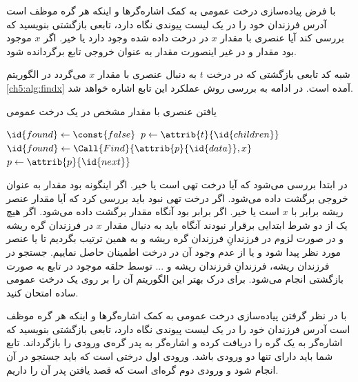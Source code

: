 
 با فرض پیاده‌سازی درخت عمومی به کمک اشاره‌گرها و اینکه هر گره موظف است آدرس فرزندان خود را در یک لیست پیوندی نگاه دارد، تابعی بازگشتی بنویسید که بررسی کند آیا عنصری با مقدار {$x$} در درخت داده شده وجود دارد یا خیر. اگر {$x$} موجود بود مقدار {} و در غیر اینصورت مقدار {} به عنوان خروجی تابع برگردانده شود.


شبه کد تابعی بازگشتی که در درخت {$t$} به دنبال عنصری با مقدار {$x$} می‌گردد در الگوریتم {\eqref{ch5:alg:findx}} آمده است. در ادامه به بررسی روش عملکرد این تابع اشاره خواهد شد.
\begin{algorithm}
\caption{یافتن عنصری با مقدار مشخص در یک درخت عمومی}\label{ch5:alg:findx}
\begin{latin}
\begin{algorithmic}[1]
				\State	\Return
		\EndIf
				\State	\Return {}
		\EndIf
		\State	$\id{found} \gets \const{false}$
		\State	$p \gets \attrib{t}{\id{children}}$
				\State	$\id{found} \gets \Call{Find}{\attrib{p}{\id{data}},x}$
				\State	$p \gets \attrib{p}{\id{next}}$
		\EndWhile
		\State	\Return {}
\EndFunction
\end{algorithmic}
\end{latin}
\end{algorithm}

در ابتدا بررسی می‌شود که آیا درخت تهی است یا خیر. اگر اینگونه بود مقدار {} به عنوان خروجی برگشت داده می‌شود. اگر درخت تهی نبود باید بررسی کرد که آیا مقدار عنصر ریشه برابر با {$x$} است یا خیر. اگر برابر بود آنگاه مقدار {} برگشت داده می‌شود. اگر هیچ یک از دو شرط ابتدایی برقرار نبودند آنگاه باید به دنبال مقدار {$x$} در فرزندان گره ریشه و در صورت لزوم در فرزندانِ فرزندان گره ریشه و به همین ترتیب بگردیم تا یا عنصر مورد نظر پیدا شود و یا از عدم وجود آن در درخت اطمینان حاصل نماییم. جستجو در فرزندان ریشه، فرزندانِ فرزندان ریشه و ... توسط حلقه موجود در تابع به صورت بازگشتی انجام می‌شود. برای درک بهتر این الگوریتم آن را بر روی یک درخت عمومی ساده امتحان کنید.

 با در نظر گرفتن پیاده‌سازی درخت عمومی به کمک اشاره‌گرها و اینکه هر گره موظف است آدرس فرزندان خود را در یک لیست پیوندی نگاه دارد، تابعی بازگشتی بنویسید که اشاره‌گر به یک گره را دریافت کرده و اشاره‌گر به پدر گره‌ی ورودی را بازگرداند. تابع شما باید دارای تنها دو ورودی باشد. ورودی اول درختی است که باید جستجو در آن انجام شود و ورودی دوم گره‌ای است که قصد یافتن پدر آن را داریم.

